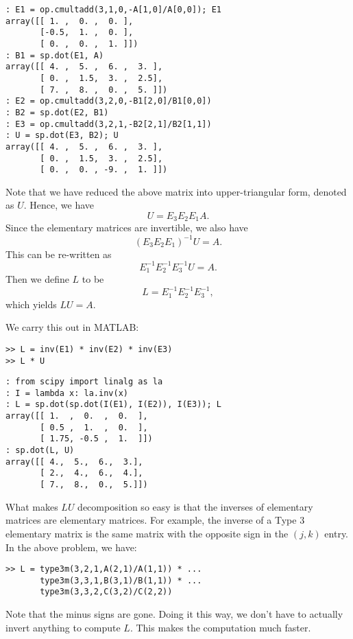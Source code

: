 \begin{python}
\begin{lstlisting}[style=python]
: E1 = op.cmultadd(3,1,0,-A[1,0]/A[0,0]); E1
array([[ 1. ,  0. ,  0. ],
       [-0.5,  1. ,  0. ],
       [ 0. ,  0. ,  1. ]])
: B1 = sp.dot(E1, A)
array([[ 4. ,  5. ,  6. ,  3. ],
       [ 0. ,  1.5,  3. ,  2.5],
       [ 7. ,  8. ,  0. ,  5. ]])
: E2 = op.cmultadd(3,2,0,-B1[2,0]/B1[0,0])
: B2 = sp.dot(E2, B1)
: E3 = op.cmultadd(3,2,1,-B2[2,1]/B2[1,1])
: U = sp.dot(E3, B2); U
array([[ 4. ,  5. ,  6. ,  3. ],
       [ 0. ,  1.5,  3. ,  2.5],
       [ 0. ,  0. , -9. ,  1. ]])
\end{lstlisting}
\end{python}
Note that we have reduced the above matrix into upper-triangular
form, denoted as $U$.  Hence, we have
\[
U = E_3 E_2 E_1 A.
\]
Since the elementary matrices are invertible, we also have
\[
(E_3 E_2 E_1)^{-1} U =  A.
\]
This can be re-written as
\[
E_1^{-1} E_2^{-1} E_3^{-1} U =  A.
\]
Then we define $L$ to be
\[
L = E_1^{-1} E_2^{-1} E_3^{-1},
\]
which yields $L U = A$.  
\begin{matlab}
We carry this out in MATLAB:
\begin{lstlisting}[style=matlab]
>> L = inv(E1) * inv(E2) * inv(E3)
>> L * U
\end{lstlisting}
\end{matlab}

\begin{python}
\begin{lstlisting}[style=python]
: from scipy import linalg as la
: I = lambda x: la.inv(x)
: L = sp.dot(sp.dot(I(E1), I(E2)), I(E3)); L
array([[ 1.  ,  0.  ,  0.  ],
       [ 0.5 ,  1.  ,  0.  ],
       [ 1.75, -0.5 ,  1.  ]])
: sp.dot(L, U)
array([[ 4.,  5.,  6.,  3.],
       [ 2.,  4.,  6.,  4.],
       [ 7.,  8.,  0.,  5.]])
\end{lstlisting}
\end{python}
What makes $LU$ decomposition so easy is that the inverses of
elementary matrices are elementary matrices.  For example, the
inverse of a Type 3 elementary matrix is the same matrix with the
opposite sign in the $(j,k)$ entry.  In the above problem, we have:
\begin{matlab}
\begin{lstlisting}[style=matlab]
>> L = type3m(3,2,1,A(2,1)/A(1,1)) * ...
       type3m(3,3,1,B(3,1)/B(1,1)) * ...
       type3m(3,3,2,C(3,2)/C(2,2))
\end{lstlisting}
\end{matlab}
Note that the minus signs are gone.  Doing it this way, we don't
have to actually invert anything to compute $L$.  This makes the
computation much faster.

